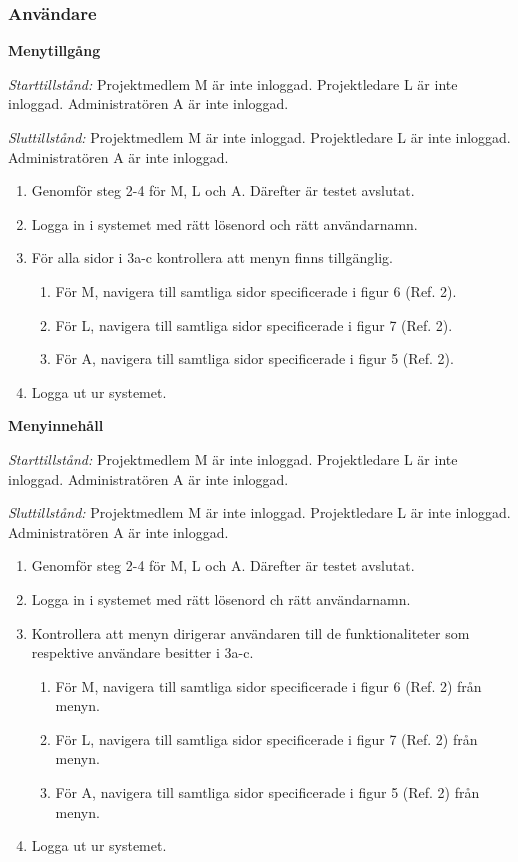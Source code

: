 \documentclass[a4paper]{article}
\begin{document}
\subsubsection{Användare}
\begin{FT}
\item \textbf{Menytillgång}

\emph{Starttillstånd:} Projektmedlem M är inte inloggad. Projektledare L är inte inloggad. Administratören A är inte inloggad.

\emph{Sluttillstånd:} Projektmedlem M är inte inloggad. Projektledare L är inte inloggad. Administratören A är inte inloggad.

\begin{enumerate}
\item Genomför steg 2-4 för M, L och A. Därefter är testet avslutat.
\item Logga in i systemet med rätt lösenord och rätt användarnamn.
\item För alla sidor i 3a-c kontrollera att menyn finns tillgänglig.
\begin{enumerate}
\item För M, navigera till samtliga sidor specificerade i figur 6 (Ref. 2).
\item För L, navigera till samtliga sidor specificerade i figur 7 (Ref. 2).
\item För A, navigera till samtliga sidor specificerade i figur 5 (Ref. 2).
\end{enumerate}
\item Logga ut ur systemet.
\end{enumerate}

\item \textbf{Menyinnehåll}

\emph{Starttillstånd:} Projektmedlem M är inte inloggad. Projektledare L är inte inloggad. Administratören A är inte inloggad.

\emph{Sluttillstånd:} Projektmedlem M är inte inloggad. Projektledare L är inte inloggad. Administratören A är inte inloggad.

\begin{enumerate}
\item Genomför steg 2-4 för M, L och A. Därefter är testet avslutat.
\item Logga in i systemet med rätt lösenord ch rätt användarnamn.
\item Kontrollera att menyn dirigerar användaren till de funktionaliteter som respektive användare besitter i 3a-c.
\begin{enumerate}
\item För M, navigera till samtliga sidor specificerade i figur 6 (Ref. 2) från menyn.
\item För L, navigera till samtliga sidor specificerade i figur 7 (Ref. 2) från menyn.
\item För A, navigera till samtliga sidor specificerade i figur 5 (Ref. 2) från menyn.
\end{enumerate}
\item Logga ut ur systemet.
\end{enumerate}


\end{FT}
\end{document}
